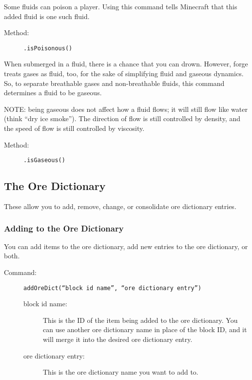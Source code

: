 \documentclass[letterpaper,titlepage,12pt]{article}
\begin{document}
Some fluids can poison a player.  Using this command tells Minecraft that this added fluid is one such fluid.

\begin{description}
\item[Method:] \texttt{.isPoisonous()}
\end{description}

When submerged in a fluid, there is a chance that you can drown.  However, forge treats gases as fluid, too, for the sake of simplifying fluid and gaseous dynamics.  So, to separate breathable gases and non-breathable fluids, this command determines a fluid to be gaseous.

NOTE: being gaseous does not affect how a fluid flows; it will still flow like water (think ``dry ice smoke'').  The direction of flow is still controlled by density, and the speed of flow is still controlled by viscosity.

\begin{description}
\item[Method:] \texttt{.isGaseous()}
\end{description}

\subsection{The Ore Dictionary}

These allow you to add, remove, change, or consolidate ore dictionary entries.

\subsubsection{Adding to the Ore Dictionary}

You can add items to the ore dictionary, add new entries to the ore dictionary, or both.

\begin{description}
\item[Command:] \texttt{addOreDict(``block id name'', ``ore dictionary entry'')}
\begin{description}
\item [block id name:] This is the ID of the item being added to the ore dictionary.  You can use another ore dictionary name in place of the block ID, and it will merge it into the desired ore dictionary entry.
\item [ore dictionary entry:] This is the ore dictionary name you want to add to.
\end{description}
\end{description}
\end{document}
